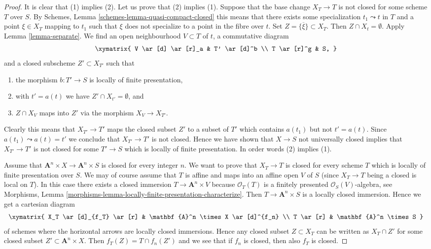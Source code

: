 \begin{proof}
It is clear that (1) implies (2). Let us prove that (2) implies (1).
Suppose that the base change $X_T \to T$ is not closed for some
scheme $T$ over $S$. By
Schemes, Lemma \ref{schemes-lemma-quasi-compact-closed}
this means that there exists some specialization $t_1 \leadsto t$ in
$T$ and a point $\xi \in X_T$ mapping to $t_1$ such that $\xi$ does not
specialize to a point in the fibre over $t$. Set
$Z = \overline{\{\xi\}} \subset X_T$. Then $Z \cap X_t = \emptyset$. Apply
Lemma \ref{lemma-separate}.
We find an open neighbourhood $V \subset T$ of $t$, a commutative diagram
$$
\xymatrix{
V \ar[d] \ar[r]_a & T' \ar[d]^b \\
T \ar[r]^g & S,
}
$$
and a closed subscheme $Z' \subset X_{T'}$ such that
\begin{enumerate}
\item the morphism $b : T' \to S$ is locally of finite presentation,
\item with $t' = a(t)$ we have $Z' \cap X_{t'} = \emptyset$, and
\item $Z \cap X_V$ maps into $Z'$ via the morphism $X_V \to X_{T'}$.
\end{enumerate}
Clearly this means that $X_{T'} \to T'$ maps the closed subset $Z'$
to a subset of $T'$ which contains $a(t_1)$ but not $t' = a(t)$.
Since $a(t_1) \leadsto a(t) = t'$ we conclude that $X_{T'} \to T'$
is not closed. Hence we have shown that $X \to S$ not universally closed
implies that $X_{T'} \to T'$ is not closed for some $T' \to S$
which is locally of finite presentation. In order words (2)
implies (1).

\medskip\noindent
Assume that $\mathbf{A}^n \times X \to \mathbf{A}^n \times S$ is
closed for every integer $n$. We want to prove that $X_T \to T$ is
closed for every scheme $T$ which is locally of finite presentation
over $S$. We may of course assume that $T$ is affine and maps into
an affine open $V$ of $S$ (since $X_T \to T$ being a closed is local on $T$).
In this case there exists a closed immersion $T \to \mathbf{A}^n \times V$
because $\mathcal{O}_T(T)$ is a finitely presented
$\mathcal{O}_S(V)$-algebra, see
Morphisms,
Lemma \ref{morphisms-lemma-locally-finite-presentation-characterize}.
Then $T \to \mathbf{A}^n \times S$ is a locally closed immersion.
Hence we get a cartesian diagram
$$
\xymatrix{
X_T \ar[d]_{f_T} \ar[r] & \mathbf{A}^n \times X \ar[d]^{f_n} \\
T \ar[r] & \mathbf{A}^n \times S
}
$$
of schemes where the horizontal arrows are locally closed immersions.
Hence any closed subset $Z \subset X_T$ can be written as
$X_T \cap Z'$ for some closed subset $Z' \subset \mathbf{A}^n \times X$.
Then $f_T(Z) = T \cap f_n(Z')$ and we see that if $f_n$ is closed, then
also $f_T$ is closed.
\end{proof}

